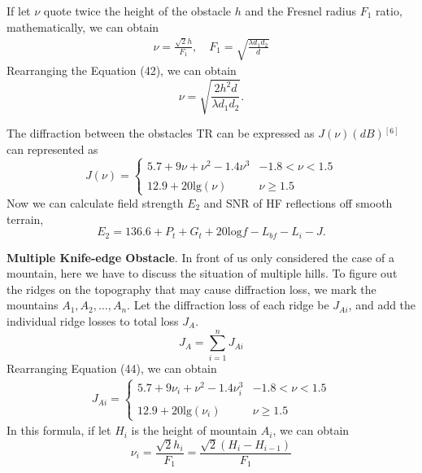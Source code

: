 \documentclass{mcmthesis}
\begin{document}
If let $\nu$ quote twice the height of the obstacle $h$ and the Fresnel radius $F_1$ ratio, mathematically, we can obtain
\begin{align}
\nu = \frac{\sqrt{2}h}{F_1}, \quad
F_1 = \displaystyle\sqrt{\frac{\lambda d_1d_2}{d}} 
\end{align}
Rearranging the Equation (42), we can obtain
\begin{equation}
\nu = \displaystyle\sqrt{\frac{2h^2d}{\lambda d_1d_2}}. 
\end{equation}

The diffraction between the obstacles TR can be expressed as $J(\nu)(dB)$$^{[6]}$ can represented as
\begin{equation}
J(\nu) = 
\begin{cases}
5.7+9\nu + \nu^2 -1.4\nu^3 & -1.8<\nu<1.5 \\\\
12.9+20\mathrm{lg}(\nu) & \nu\geqslant 1.5
\end{cases}
\end{equation}
Now we can calculate field strength $E_2$ and SNR of HF reflections off smooth terrain,
\begin{equation}
E_2 = 136.6+P_t+G_t+20\mathrm{log} f-L_{bf}-L_i-J.
\end{equation}

 \textbf{Multiple Knife-edge Obstacle}. In front of us only considered the case of a mountain, here we have to discuss the situation of multiple hills. To figure out the ridges on the topography that may cause diffraction loss, we mark the mountains $A_1,A_2,\ldots,A_n$.
Let the diffraction loss of each ridge be $J_{Ai}$, and add the individual ridge losses to total loss $J_A$. 
\begin{equation}
J_A = \sum\limits_{i=1}^nJ_{Ai} 
\end{equation}
Rearranging Equation (44), we can obtain
\begin{align}
J_{Ai}  = 
\begin{cases}
5.7+9\nu_i+\nu^2-1.4\nu_i^3 & -1.8<\nu<1.5\\
\\
12.9 + 20\mathrm{lg}(\nu_i) & \nu\geqslant 1.5
\end{cases}
\end{align}
In this formula, if let $H_i$ is the height of mountain $A_i$, we can obtain
\begin{equation}
\nu_i = \frac{\sqrt{2}h_i}{F_1} = \frac{\sqrt{2}(H_i-H_{i-1})}{F_1}
\end{equation}
\end{document}
